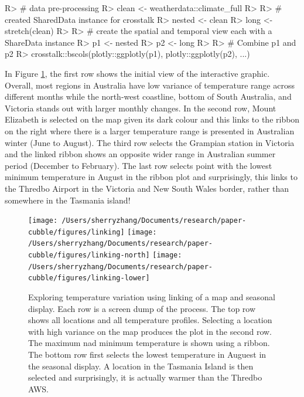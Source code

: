 \documentclass[
]{jss}
\begin{document}
\begin{CodeChunk}
\begin{CodeInput}
R> # data pre-processing
R> clean <- weatherdata::climate_full %
R> 
R> # created SharedData instance for crosstalk
R> nested <- clean %
R> long <- stretch(clean) %
R> 
R> # create the spatial and temporal view each with a ShareData instance
R> p1 <- nested %
R> p2 <- long %
R> 
R> # Combine p1 and p2
R> crosstalk::bscols(plotly::ggplotly(p1), plotly::ggplotly(p2), ...)
\end{CodeInput}
\end{CodeChunk}

In Figure \ref{fig:interactive-linking}, the first row shows the initial
view of the interactive graphic. Overall, most regions in Australia have
low variance of temperature range across different months while the
north-west coastline, bottom of South Australia, and Victoria stands out
with larger monthly changes. In the second row, Mount Elizabeth is
selected on the map given its dark colour and this links to the ribbon
on the right where there is a larger temperature range is presented in
Australian winter (June to August). The third row selects the Grampian
station in Victoria and the linked ribbon shows an opposite wider range
in Australian summer period (December to February). The last row selects
point with the lowest minimum temperature in August in the ribbon plot
and surprisingly, this links to the Thredbo Airport in the Victoria and
New South Wales border, rather than somewhere in the Tasmania island!

\begin{CodeChunk}
\begin{figure}

{\centering \texttt{[image: /Users/sherryzhang/Documents/research/paper-cubble/figures/linking]} \texttt{[image: /Users/sherryzhang/Documents/research/paper-cubble/figures/linking-north]} \texttt{[image: /Users/sherryzhang/Documents/research/paper-cubble/figures/linking-lower]} 

}

\caption[Exploring temperature variation using linking of a map and seasonal display]{Exploring temperature variation using linking of a map and seasonal display. Each row is a screen dump of the process. The top row shows all locations and all temperature profiles. Selecting a location with high variance on the map produces the plot in the second row. The maximum nad minimum temperature is shown using a ribbon. The bottom row first selects the lowest temperature in Auguest in the seasonal display. A location in the Tasmania Island is then selected and surprisingly, it is actually warmer than the Thredbo AWS.}\label{fig:interactive-linking}
\end{figure}
\end{CodeChunk}
\end{document}
